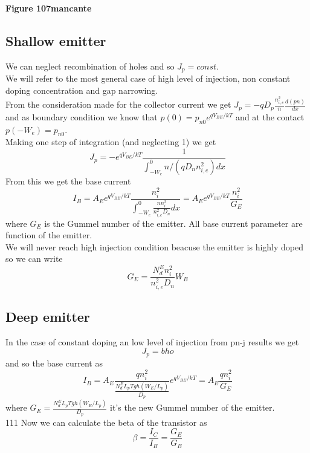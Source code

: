 \centering
{\bf Figure 107mancante}\\
\raggedright
\subsection{Shallow emitter}
We can neglect recombination of holes and so $J_p=const$.\\
We will refer to the most general case of high level of injection, non constant doping concentration and gap narrowing.\\
From the consideration made for the collector current we get $J_p=-qD_p \frac{n_{i,e}^2}{n}\frac{d(pn)}{dx}$ and as boundary condition we know that $p(0)=p_{n0}e^{qV_{BE}/kT}$ and at the contact $p(-W_e)=p_{n0}$.\\
Making one step of integration (and neglecting 1) we get 
\begin{equation}
J_p=-e^{qV_{BE}/kT}\frac{1}{\int_{-W_e}^0 n/(qD_nn_{i,e}^2) dx}
\end{equation}
From this we get the base current
\begin{equation}
I_B= A_E e^{qV_{BE}/kT}\frac{n_i^2}{\int_{-W_e}^{0}\frac{n n_i^2}{n_{i,e}^2D_n} dx}=A_Ee^{qV_{BE}/kT}\frac{n_i^2}{G_E}
\end{equation}
where $G_E$ is the Gummel number of the emitter. All base current parameter are function of the emitter.\\
We will never reach high injection condition beacuse the emitter is highly doped so we can write
\begin{equation}
G_E= \frac{N_d^En_i^2}{n_{i,e}^2D_n}W_B 
\end{equation}

\subsection{Deep emitter}
In the case of constant doping an low level of injection from pn-j results we get
\begin{equation}
J_p={bho}
\end{equation}
and so the base current as
\begin{equation}
I_B=A_E \frac{qn_i^2}{\frac{N_d^EL_p Tgh(W_E/L_p)}{D_p}}e^{qV_{BE}/kT}=A_E \frac{qn_i^2}{G_E}
\end{equation}
where $G_E=\frac{N_d^EL_p Tgh(W_E/L_p)}{D_p}$ it's the new Gummel number of the emitter. \\111
Now we can calculate the beta of the transistor as
\begin{equation}
\beta=\frac{I_C}{I_B}=\frac{G_E}{G_B}
\end{equation}

